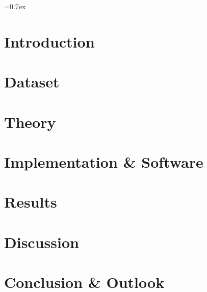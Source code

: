 


	
	\font=0.7ex%

	
	\tableofcontents
	\thispagestyle{empty}
	
	\pagestyle{fancy}
	\fancyhf{}
	\cfoot{\thepage}
	
	\newpage
	\section{Introduction}
	
	
	\section{Dataset}\label{sec:dataset}
	
	
	\section{Theory}\label{sec:theory}
	
	
	\section{Implementation \& Software}\label{sec:implementation_software}
	
	
	\section{Results}\label{sec:results}
	
	
	\section{Discussion}\label{sec:discussion}
	
	
	\section{Conclusion \& Outlook}\label{sec:conclusion_outlook}
	

	\newpage
	\printbibliography
	
